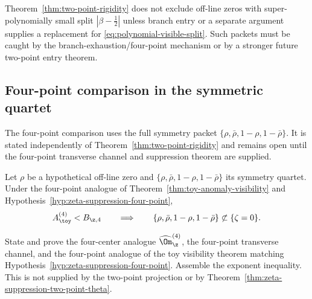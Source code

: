 \begin{remark}
\label{rem:two-point-polynomial-split-limitation}
Theorem~\ref{thm:two-point-rigidity} does not exclude off-line zeros with
super-polynomially small split \(|\beta-\tfrac12|\) unless branch entry or a
separate argument supplies a replacement for
\eqref{eq:polynomial-visible-split}.  Such packets must be caught by the
branch-exhaustion/four-point mechanism or by a stronger future two-point
entry theorem.
\end{remark}

\subsection{Four-point comparison in the symmetric quartet}
\label{subsec:four-point-comparison-symmetric-quartet}

The four-point comparison uses the full symmetry packet
\(\{\rho,\bar\rho,1-\rho,1-\bar\rho\}\).  It is stated independently of
Theorem~\ref{thm:two-point-rigidity} and remains open until the four-point
transverse channel and suppression theorem are supplied.

\begin{theorem}
\label{thm:four-point-rigidity}
Let \(\rho\) be a hypothetical off-line zero and
\(\{\rho,\bar\rho,1-\rho,1-\bar\rho\}\) its symmetry quartet.  Under the
four-point analogue of Theorem~\ref{thm:toy-anomaly-visibility} and
Hypothesis~\ref{hyp:zeta-suppression-four-point},
\[
A_\toy^{(4)} < B_{\z,4} \qquad\Longrightarrow\qquad
\{\rho,\bar\rho,1-\rho,1-\bar\rho\}\not\subset\{\zeta=0\}.
\]
\end{theorem}

\begin{wip}\label{rem:wip-four-point-rigidity}
State and prove the four-center analogue \(\widehat\Om_\z^{(4)}\), the
four-point transverse channel, and the four-point analogue of the toy
visibility theorem matching Hypothesis~\ref{hyp:zeta-suppression-four-point}.
Assemble the exponent inequality.  This is not supplied by the two-point
projection or by Theorem~\ref{thm:zeta-suppression-two-point-theta}.
\end{wip}
